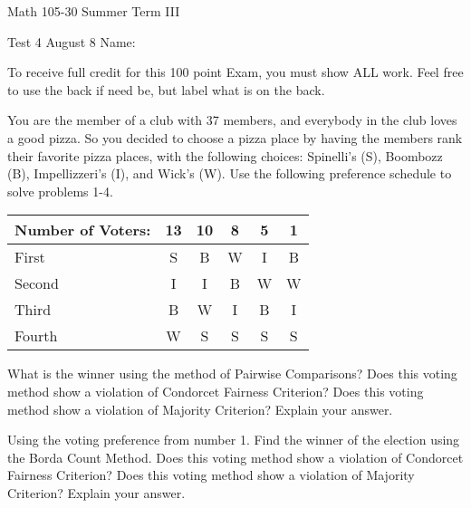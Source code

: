 \documentclass[11pt,epsfig]{article}
\begin{document}
Math 105-30 Summer Term III 

Test 4 August 8 \hspace{1.9in} {Name:} {\underline {\hspace{3.5in}}}
\vspace{2pc}

To receive full credit for this 100 point Exam, you must show ALL work. Feel free to use the back if need be, but label what is on the back. 
\vspace{0.5pc}

   
\begin{problem}{15}
You are the member of a club with 37 members, and everybody in the club loves a good pizza. So you decided to choose a pizza place by having the members rank their favorite pizza places, with the following choices: Spinelli’s (S), Boombozz (B), Impellizzeri’s (I), and Wick’s (W). Use the following preference schedule to solve problems 1-4.

 \begin{center}
 \begin{tabular}{ | l | c | c  |  c |  c | c |}
   \hline
   Number of Voters: & 13 & 10 & 8 & 5 & 1\\ \hline
   First & S & B & W & I & B \\ \hline
   Second & I & I & B & W & W \\ \hline
   Third & B & W & I & B & I \\ \hline
   Fourth & W & S & S & S & S \\ \hline
   \end{tabular}
  \end{center}
What is the winner using the method of Pairwise Comparisons? Does this voting method show a violation of Condorcet Fairness Criterion? Does this voting method show a violation of Majority Criterion? Explain your answer. 


\vfill
\end{problem}


\begin{problem}{15}
Using the voting preference from number 1. Find the winner of the election using the Borda Count Method. Does this voting method show a violation of Condorcet Fairness Criterion? Does this voting method show a violation of Majority Criterion? Explain your answer.
\vfill
\end{problem}
\end{document}
